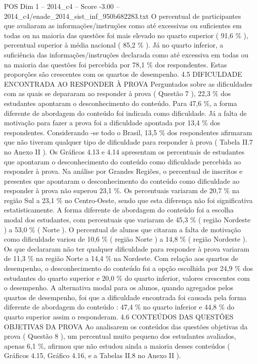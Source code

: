 \begin{textsample}{POS Dim 1 – 2014\_c4 – Score -3.00 – 2014\_c4/enade\_2014\_sist\_inf\_950b682283.txt}
O percentual de participantes que avaliaram as informações/instruções como até excessivas ou suficientes em todas ou na maioria das questões foi mais elevado no quarto superior ( 91,6 \% ), percentual superior à média nacional ( 85,2 \% ).
Já no quarto inferior, a suficiência das informações/instruções declarada como até excessiva em todas ou na maioria das questões foi percebida por 78,1 \% dos respondentes.
Estas proporções são crescentes com os quartos de desempenho. 4.5 DIFICULDADE ENCONTRADA AO RESPONDER À PROVA Perguntados sobre as dificuldades com as quais se depararam ao responder à prova ( Questão 7 ), 22,3 \% dos estudantes apontaram o desconhecimento do conteúdo.
Para 47,6 \%, a forma diferente de abordagem do conteúdo foi indicada como dificuldade.
Já a falta de motivação para fazer a prova foi a dificuldade apontada por 13,4 \% dos respondentes.
Considerando -se todo o Brasil, 13,5 \% dos respondentes afirmaram que não tiveram qualquer tipo de dificuldade para responder à prova ( Tabela II.7 no Anexo II ).
Os Gráficos 4.13 e 4.14 apresentam os percentuais de estudantes que apontaram o desconhecimento do conteúdo como dificuldade percebida ao responder à prova.
Na análise por Grandes Regiões, o percentual de inscritos e presentes que apontaram o desconhecimento do conteúdo como dificuldade ao responder à prova não superou 23,1 \%.
Os percentuais variaram de 20,7 \% na região Sul a 23,1 \% no Centro-Oeste, sendo que esta diferença não foi significativa estatisticamente.
A forma diferente de abordagem do conteúdo foi a escolha modal dos estudantes, com percentuais que variaram de 45,3 \% ( região Nordeste ) a 53,0 \% ( Norte ).
O percentual de alunos que citaram a falta de motivação como dificuldade variou de 10,6 \% ( região Norte ) a 14,8 \% ( região Nordeste ).
Os que declararam não ter qualquer dificuldade para responder à prova variaram de 11,3 \% na região Norte a 14,4 \% na Nordeste.
Com relação aos quartos de desempenho, o desconhecimento do conteúdo foi a opção escolhida por 24,9 \% dos estudantes do quarto superior e 20,0 \% do quarto inferior, valores crescentes com o desempenho.
A alternativa modal para os alunos, quando agregados pelos quartos de desempenho, foi que a dificuldade encontrada foi causada pela forma diferente de abordagem do conteúdo : 47,4 \% no quarto inferior e 44,8 \% do quarto superior assim o responderam. 4.6 CONTEÚDOS DAS QUESTÕES OBJETIVAS DA PROVA Ao analisarem os conteúdos das questões objetivas da prova ( Questão 8 ), um percentual muito pequeno dos estudantes avaliados, apenas 6,1 \%, afirmou que não estudou ainda a maioria desses conteúdos ( Gráficos 4.15, Gráfico 4.16, e a Tabelas II.8 no Anexo II ).

\end{textsample}
